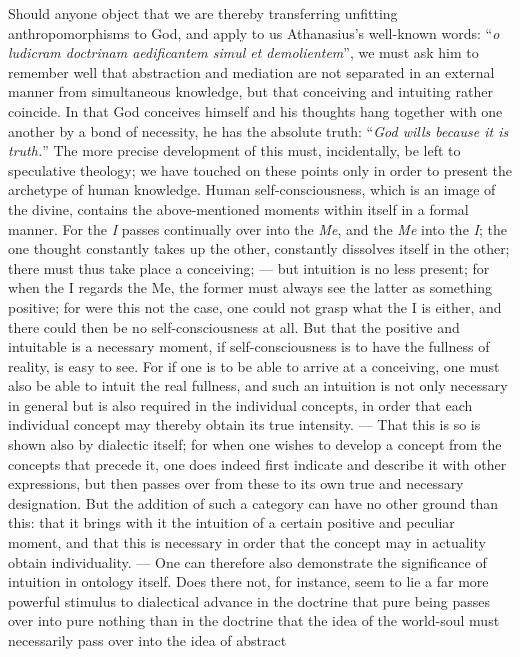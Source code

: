\documentclass[12pt]{book}
\newcommand{\opage}[1]{\marginnote{\footnotesize\textit{[#1]}}}
\begin{document}
Should anyone object that we are thereby transferring unfitting
anthropomorphisms to God, and apply to us Athanasius's well-known words:
``\textit{o ludicram doctrinam aedificantem simul et demolientem}'', we must ask
him to remember well that abstraction and mediation are not separated in an
external manner from simultaneous knowledge, but that conceiving and intuiting
rather coincide. In that God conceives himself and his thoughts hang together
with one another by a bond of necessity, he has the absolute truth: ``\emph{God
wills because it is truth.}'' The more precise development of this must,
incidentally, be left to speculative theology; we have touched on these points
only in order to present the archetype of human knowledge.
\opage{45} Human self-consciousness, which is an image of the divine, contains
the above-mentioned moments within itself in a formal manner. For the \emph{I}
passes continually over into the \emph{Me}, and the \emph{Me} into the
\emph{I}; the one thought constantly takes up the other, constantly dissolves
itself in the other; there must thus take place a conceiving; --- but intuition
is no less present; for when the I regards the Me, the former must always see
the latter as something positive; for were this not the case, one could not
grasp what the I is either, and there could then be no self-consciousness at
all. But that the positive and intuitable is a necessary moment, if
self-consciousness is to have the fullness of reality, is easy to see. For if
one is to be able to arrive at a conceiving, one must also be able to intuit
the real fullness, and such an intuition is not only necessary in general but
is also required in the individual concepts, in order that each individual
concept may thereby obtain its true intensity. --- That this is so is shown
also by dialectic itself; for when one wishes to develop a concept from the
concepts that precede it, one does indeed first indicate and describe it with
other expressions, but then passes over from these to its own true and
necessary designation. But the addition of such a category can have no other
ground than this: that it brings with it the intuition of a certain positive
and peculiar moment, and that this is necessary in order that the concept may
in actuality obtain individuality. --- One can therefore also demonstrate the
significance of intuition in ontology itself. Does there not, for instance,
seem to lie a far more powerful stimulus to dialectical advance in the doctrine
that pure being passes over into pure nothing than in the doctrine that the
idea of the world-soul must necessarily pass over into the idea of abstract
\end{document}
